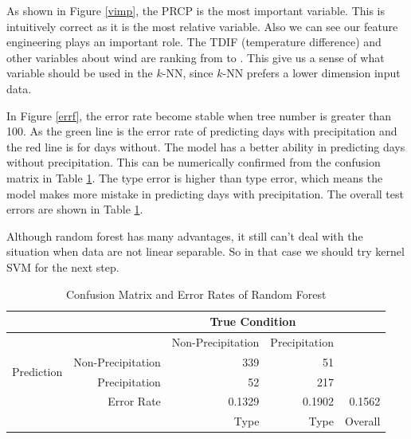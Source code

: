 As shown in Figure \ref{vimp}, the PRCP is the most important variable. This is intuitively correct as it is the most relative variable. Also we can see our feature engineering plays an important role. The TDIF (temperature difference) and other variables about wind are ranking from  to . This give us a sense of what variable should be used in the $k$-NN, since $k$-NN prefers a lower dimension input data.

In Figure \ref{errf}, the error rate become stable when tree number is greater than 100. As the green line is the error rate of predicting days with precipitation and the red line is for days without. The model has a better ability in predicting days without precipitation. This can be numerically confirmed from the confusion matrix in Table \ref{tblrf}. The type \uppercase\expandafter{} error is higher than type \uppercase\expandafter{} error, which means the model makes more mistake in predicting days with precipitation. The overall test errors are shown in Table \ref{tblrf}.

Although random forest has many advantages, it still can't deal with the situation when data are not linear separable. So in that case we should try kernel SVM for the next step.

\begin{table}[h]
\setlength{\belowcaptionskip}{5pt}
\caption{Confusion Matrix and Error Rates of Random Forest}
\label{tblrf}
\centering
\renewcommand\arraystretch{1.5}
\begin{tabular}{rrrrr}
\hline
\hline
 & & \multicolumn{2}{c}{True Condition} & \\
\hline
 & & Non-Precipitation & Precipitation & \\
\cline{1-4}
\multirow{2}{*}{Prediction} & {Non-Precipitation} & 339 & 51 & \\
\cline{2-4}
&Precipitation&52&217&\\
\hline
&Error Rate & 0.1329 & 0.1902 & 0.1562\\
\cline{2-5}
& & Type \uppercase\expandafter{\romannumeral1} & Type \uppercase\expandafter{\romannumeral2} & Overall\\
\hline
\end{tabular}
\end{table}